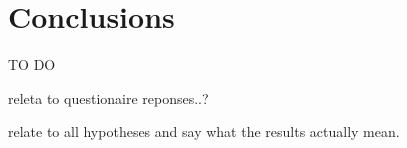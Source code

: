 \documentclass[11pt,english]{article}
\begin{document}










\section{Conclusions}

TO DO

releta to questionaire reponses..?

relate to all hypotheses and say what the results actually mean.



















\end{document}
